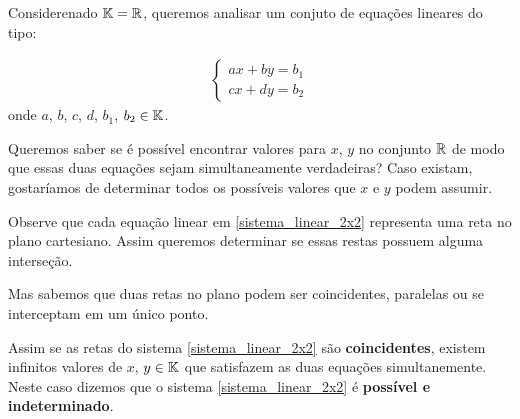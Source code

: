 Considerenado $\mathbb{K} = \mathbb{R}$, queremos analisar um conjuto de equações lineares do tipo:

\begin{align}
    \begin{cases}\label{sistema_linear_2x2}
        ax + by = b_1\\
        cx + dy = b_2
    \end{cases}
\end{align}
onde $a$, $b$, $c$, $d$, $b_1$, $b_2 \in \mathbb{K}$.

Queremos saber se é possível encontrar valores para $x$, $y$ no conjunto $\mathbb{R}$ de modo que essas duas equações sejam simultaneamente verdadeiras? Caso existam, gostaríamos de determinar todos os possíveis valores que $x$ e $y$ podem assumir.

Observe que cada equação linear em \eqref{sistema_linear_2x2} representa uma reta no plano cartesiano. Assim queremos determinar se essas restas possuem alguma interseção.

Mas sabemos que duas retas no plano podem ser coincidentes, paralelas ou se interceptam em um único ponto.

Assim se as retas do sistema \eqref{sistema_linear_2x2} são \textbf{coincidentes}, existem infinitos valores de $x$, $y \in \mathbb{K}$ que satisfazem as duas equações simultanemente. Neste caso dizemos que o sistema \eqref{sistema_linear_2x2} é \textbf{possível e indeterminado}.

\begin{center}
\end{center}

